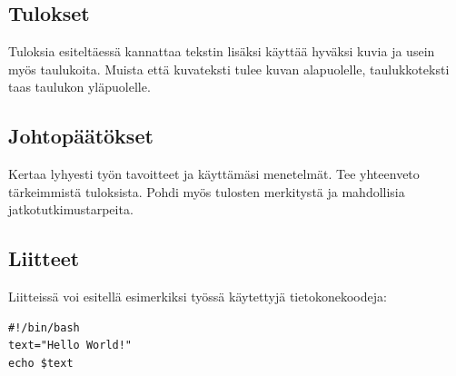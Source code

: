 \documentclass[finnish,twoside,openright]{HYgradu}
\begin{document}
\section{Tulokset}
%
%
Tuloksia esitelt\"aess\"a kannattaa tekstin lis\"aksi k\"aytt\"a\"a hyv\"aksi kuvia ja usein my\"os taulukoita. Muista ett\"a kuvateksti tulee kuvan alapuolelle, taulukkoteksti taas taulukon yl\"apuolelle.

\section{Johtop\"a\"at\"okset}

Kertaa lyhyesti ty\"on tavoitteet ja k\"aytt\"am\"asi menetelm\"at. Tee yhteenveto t\"arkeimmist\"a tuloksista. Pohdi my\"os tulosten merkityst\"a ja mahdollisia jatkotutkimustarpeita.

\begin{appendices}
\myappendixtitle

\chapter{Liitteet}
Liitteiss\"a voi esitell\"a esimerkiksi ty\"oss\"a k\"aytettyj\"a tietokonekoodeja:
\begin{verbatim}
#!/bin/bash          
text="Hello World!"
echo $text
\end{verbatim}

\end{appendices}


\cleardoublepage %


\end{document}

